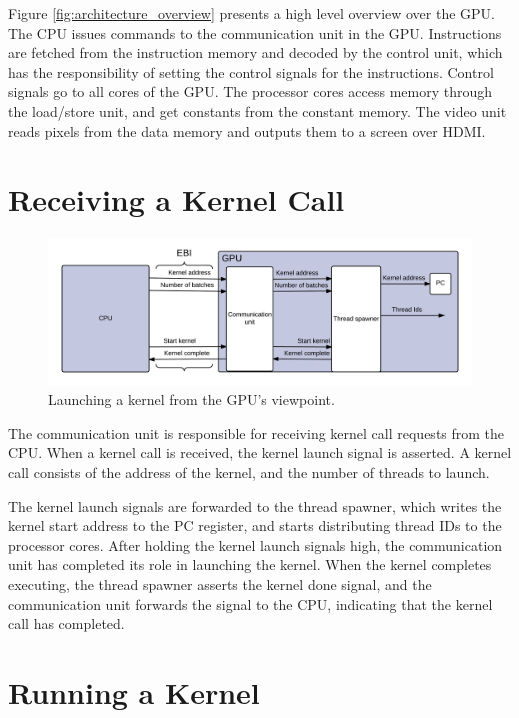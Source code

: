 \documentclass[../main/report.tex]{subfiles}
\begin{document}
Figure \ref{fig:architecture_overview} presents a high level overview over the GPU.
The CPU issues commands to the communication unit in the GPU.
Instructions are fetched from the instruction memory and decoded by the control unit,
which has the responsibility of setting the control signals for the instructions.
Control signals go to all cores of the GPU.
The processor cores access memory through the load/store unit, and get constants from the constant memory.
The video unit reads pixels from the data memory and outputs them to a screen over HDMI.

\section{Receiving a Kernel Call}
\begin{figure}[H]
\centering
\includegraphics[width=\textwidth]{../gpu/diagrams/receiving_a_kernel_call.png}
\caption{Launching a kernel from the GPU's viewpoint.}
\label{fig:kernel_call}
\end{figure}

The communication unit is responsible for receiving kernel call requests from the CPU.
When a kernel call is received, the kernel launch signal is asserted.
A kernel call consists of the address of the kernel, and the number of threads to launch.

The kernel launch signals are forwarded to the thread spawner, which writes the kernel start address to the PC register, and starts distributing thread IDs to the processor cores. 
After holding the kernel launch signals high, the communication unit has completed its role in launching the kernel.
When the kernel completes executing, the thread spawner asserts the kernel done signal, and the communication unit forwards the signal to the CPU, indicating that the kernel call has completed.

\section{Running a Kernel}
\end{document}
